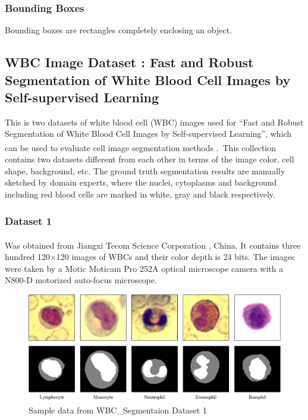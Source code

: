 {\subsubsection{Bounding Boxes}
\hspace{\parindent}
Bounding boxes are rectangles completely enclosing an object.

\vspace{-0.1in}

\subsection{WBC Image Dataset : Fast and Robust Segmentation of White Blood Cell Images by Self-supervised Learning}
\hspace{\parindent}
This is two datasets of white blood cell (WBC) images used for “Fast and Robust Segmentation of White Blood Cell Images by Self-supervised Learning”, which can be used to evaluate cell image segmentation methods \textsuperscript{\cite{Zheng2018}}.\
This collection contains two datasets different from each other in terms of the image color, cell shape, background, etc. The ground truth segmentation results are manually sketched by domain experts, where the nuclei, cytoplasms and background including red blood cells are marked in white, gray and black respectively. 

\subsubsection{Dataset 1}
\hspace{\parindent}
Was obtained from Jiangxi Tecom Science Corporation \textsuperscript{\cite{2022_tecom-cn}}, China. It contains three hundred 120×120 images of WBCs and their color depth is 24 bits. The images were taken by a Motic Moticam Pro 252A optical microscope camera with a N800-D motorized auto-focus microscope.

\begin{figure}[H]
\centering
\includegraphics[width=5.2in]{../images/WBC_Dataset1.png}
\caption{Sample data from WBC\_Segmentaion Dataset 1}
\label{fig:WBC_Dataset1_sample}
\end{figure}

}
